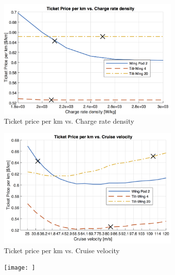 \begin{figure}[H]
\begin{subfigure}[t]{0.33\textwidth}
    \captionsetup{justification=centering}
    \caption{}
    \label{fig:sens6}
\end{subfigure}
\captionsetup{justification=centering}
\caption{}
\label{fig:sens456}
\end{figure}

\begin{figure}[H]
\begin{subfigure}[t]{0.33\textwidth}
    \centering
    \includegraphics[width=\textwidth]{Figures/CRate_TPrice_perkmNOPAD.png}
    \captionsetup{justification=centering}
    \caption{Ticket price per km vs. Charge rate density}
    \label{fig:sens7}
\end{subfigure}
\begin{subfigure}[t]{0.33\textwidth}
    \centering
    \includegraphics[width=\textwidth]{Figures/Cruise_TPrice_perkmNOPAD.png}
    \captionsetup{justification=centering}
    \caption{Ticket price per km vs. Cruise velocity}
    \label{fig:sens8}
\end{subfigure}
\begin{subfigure}[t]{0.33\textwidth}
    \centering
    \texttt{[image: ]}
    \captionsetup{justification=centering}
    \caption{}
    \label{fig:sens9}
\end{subfigure}
\captionsetup{justification=centering}
\caption{}
\label{fig:sens789}
\end{figure}

